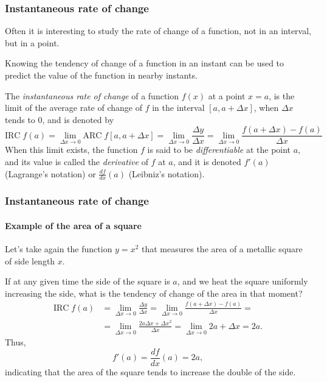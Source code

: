 \begin{frame}
\frametitle{Instantaneous rate of change}
Often it is interesting to study the rate of change of a function, not in an interval, but in a point.

Knowing the tendency of change of a function in an instant can be used to predict the value of the function in nearby instants.

\begin{definition}
The \emph{instantaneous rate of change} of a function $f(x)$ at a point $x=a$, is the limit of the average rate of change of $f$ in the interval $[a,a+\Delta x]$, when $\Delta x$ tends to 0, and is denoted by
\[
\textrm{IRC}\;f (a)=\lim_{\Delta x\rightarrow 0} \textrm{ARC}\; f[a,a+\Delta x]=\lim_{\Delta x\rightarrow 0}\frac{\Delta y}{\Delta x}=\lim_{\Delta x\rightarrow 0}\frac{f(a+\Delta x)-f(a)}{\Delta x}
\]
When this limit exists, the function $f$ is said to be \emph{differentiable} at the point $a$, and its value is called the \emph{derivative} of $f$ at $a$, and it is denoted $f'(a)$ (Lagrange's notation) or $\frac{df}{dx}(a)$ (Leibniz's notation).
\end{definition}
\end{frame}


\begin{frame}
\frametitle{Instantaneous rate of change}
\framesubtitle{Example of the area of a square}
Let's take again the function $y=x^2$ that measures the area of a metallic square of side length $x$.

If at any given time the side of the square is $a$, and we heat the square uniformly increasing the side, what is the tendency of change of the area in that moment?
\begin{align*}
\textrm{IRC}\;f(a)&=\lim_{\Delta x\rightarrow 0}\frac{\Delta y}{\Delta x}=\lim_{\Delta x\rightarrow 0}\frac{f(a+\Delta x)-f(a)}{\Delta x} =\\
&=\lim_{\Delta x\rightarrow 0}\frac{2a\Delta x+\Delta x^2}{\Delta x}=\lim_{\Delta x\rightarrow 0} 2a+\Delta x= 2a.
\end{align*}
Thus,
\[
f'(a)=\frac{df}{dx}(a)=2a,
\]
indicating that the area of the square tends to increase the double of the side.
\end{frame}


